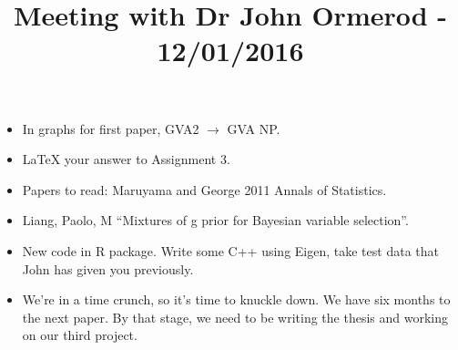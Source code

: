 \documentclass{amsart}
\title{Meeting with Dr John Ormerod - 12/01/2016}
\begin{document}
\maketitle

\begin{itemize}
\item In graphs for first paper, GVA2 $\to$ GVA NP.
\item LaTeX your answer to Assignment 3.
\item Papers to read: Maruyama and George 2011 Annals of Statistics.
\item Liang, Paolo, M ``Mixtures of g prior for Bayesian variable selection''.
\item New code in R package. Write some C++ using Eigen, take test data that John has given you previously.
\item We're in a time crunch, so it's time to knuckle down. We have six months to the next paper. By that stage,
we need to be writing the thesis and working on our third project.
\end{itemize}
\end{document}
